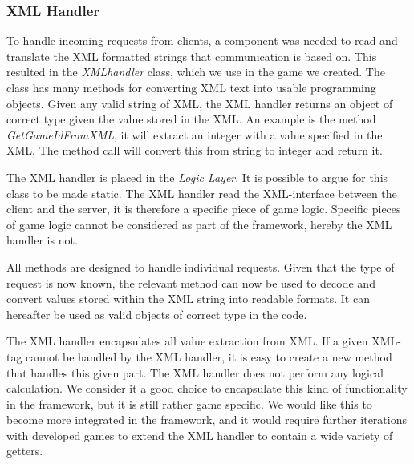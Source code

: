 \subsubsection{XML Handler}
\label{sec:xmlhandlerimpl}
To handle incoming requests from clients, a component was needed to read and translate the XML formatted strings that communication is based on. This resulted in the \textit{XMLhandler} class, which we use in the game we created. The class has many methods for converting XML text into usable programming objects. Given any valid string of XML, the XML handler returns an object of correct type given the value stored in the XML. An example is the method \textit{GetGameIdFromXML}, it will extract an integer with a value specified in the XML. The method call will convert this from string to integer and return it. 

The XML handler is placed in the \textit{Logic Layer}. It is possible to argue for this class to be made static. The XML handler read the XML-interface between the client and the server, it is therefore a specific piece of game logic.  Specific pieces of game logic cannot be considered as part of the framework, hereby the XML handler is not.

All methods are designed to handle individual requests. Given that the type of request is now known, the relevant method can now be used to decode and convert values stored within the XML string into readable formats. It can hereafter be used as valid objects of correct type in the code.

The XML handler encapsulates all value extraction from XML. If a given XML-tag cannot be handled by the XML handler, it is easy to create a new method that handles this given part. The XML handler does not perform any logical calculation. We consider it a good choice to encapsulate this kind of functionality in the framework, but it is still rather game specific. We would like this to become more integrated in the framework, and it would require further iterations with developed games to extend the XML handler to contain a wide variety of getters.